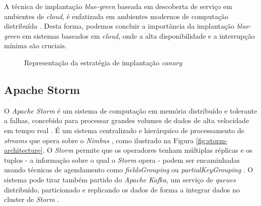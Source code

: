 A técnica de implantação \textit{blue-green} baseada em descoberta de serviço em ambientes de 
\textit{cloud}, é enfatizada em ambientes modernos de computação distribuída \cite{bluegreen}. 
Desta forma, podemos concluir a importância da implantação \textit{blue-green} em sistemas baseados 
em \textit{cloud}, onde a alta disponibilidade e a interrupção mínima são cruciais.

\begin{figure}[H]
    \centering
    \qquad
    \caption{Representação da estratégia de implantação \textit{canary}}%
    \label{fig:blue-green}%
\end{figure}

\subsection{Apache Storm}

O \textit{Apache Storm} é um sistema de computação em memória distribuído e tolerante a falhas, 
concebido para processar grandes volumes de dados de alta velocidade em tempo real \cite{storm2017}. 
É um sistema centralizado e hierárquico de processamento de \textit{streams} que opera sobre o 
\textit{Nimbus} \cite{storm2015}, como ilustrado na Figura \ref{fig:storm-architecture}. O 
\textit{Storm} permite que os operadores tenham múltiplas réplicas e os tuplos - a informação 
sobre o qual o \textit{Storm} opera - podem ser encaminhadas usando técnicas de agendamento como 
\textit{fieldsGrouping} ou \textit{partialKeyGrouping} \cite{storm2018}. O sistema pode tirar 
também partido do \textit{Apache Kafka}, um serviço de \textit{queues} distribuído, particionado e 
replicando os dados de forma a integrar dados no \gls{cluster} de \textit{Storm} \cite{storm2018b}.

